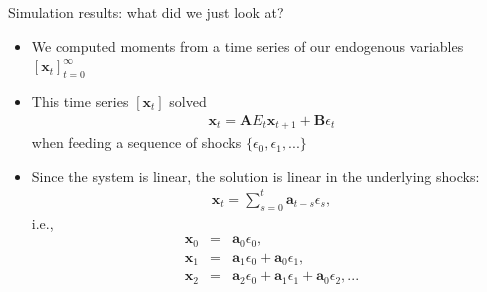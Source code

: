 \documentclass[9pt,xcolor={dvipsnames}]{beamer}
\newcommand{\bit}{\begin{itemize}}
\newcommand{\eit}{\end{itemize}}
\begin{document}
\begin{frame}{Simulation results: what did we just look at?}

\bit
\setlength\itemsep{1em} 

\item We computed moments from a time series of our endogenous variables $[\mathbf{x}_{t}]^{\infty}_{t=0}$

\item This time series $[\mathbf{x}_{t}]$ solved
\begin{eqnarray}
\mathbf{x}_{t} = \mathbf A E_t \mathbf x_{t+1}  + \mathbf {B} \epsilon_t \nonumber
\end{eqnarray}
when feeding a sequence of shocks $\{\epsilon_0, \epsilon_1, ...\}$

\item Since the system is linear, the solution is linear in the underlying shocks:
\begin{eqnarray}
\mathbf{x}_{t} = \sum_{s=0}^{t} \mathbf{a}_{t-s} \epsilon_s, \nonumber
\end{eqnarray}
i.e.,
\begin{eqnarray}
\mathbf{x}_{0} &=& \mathbf{a}_0 \epsilon_0, \nonumber \\
\mathbf{x}_{1} &=& \mathbf{a}_1 \epsilon_0 + \mathbf{a}_0 \epsilon_1, \nonumber \\
\mathbf{x}_{2} &=& \mathbf{a}_2 \epsilon_0 + \mathbf{a}_1 \epsilon_1 + \mathbf{a}_0 \epsilon_2,... \nonumber
\end{eqnarray}


\eit

\end{frame}
\end{document}
